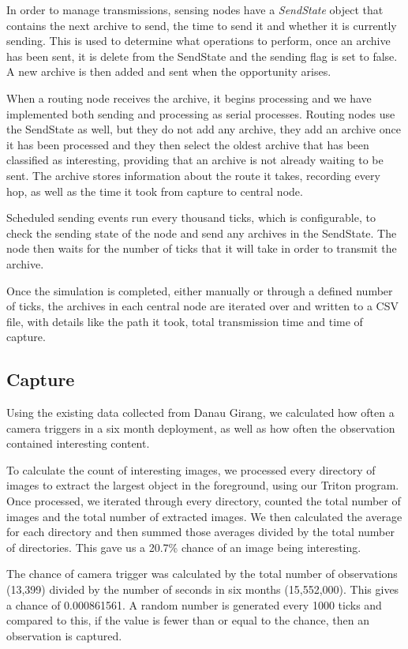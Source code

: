 	In order to manage transmissions, sensing nodes have a \textit{SendState} object that contains the next archive to send, the time to send it and whether it is currently sending. This is used to determine what operations to perform, once an archive has been sent, it is delete from the SendState and the sending flag is set to false. A new archive is then added and sent when the opportunity arises.
	
	When a routing node receives the archive, it begins processing and we have implemented both sending and processing as serial processes. Routing nodes use the SendState as well, but they do not add any archive, they add an archive once it has been processed and they then select the oldest archive that has been classified as interesting, providing that an archive is not already waiting to be sent. The archive stores information about the route it takes, recording every hop, as well as the time it took from capture to central node.
	
	Scheduled sending events run every thousand ticks, which is configurable, to check the sending state of the node and send any archives in the SendState. The node then waits for the number of ticks that it will take in order to transmit the archive.
	
	Once the simulation is completed, either manually or through a defined number of ticks, the archives in each central node are iterated over and written to a CSV file, with details like the path it took, total transmission time and time of capture.
	
\subsection{Capture}
	Using the existing data collected from Danau Girang, we calculated how often a camera triggers in a six month deployment, as well as how often the observation contained interesting content. 
	
	To calculate the count of interesting images, we processed every directory of images to extract the largest object in the foreground, using our Triton program. Once processed, we iterated through every directory, counted the total number of images and the total number of extracted images. We then calculated the average for each directory and then summed those averages divided by the total number of directories. This gave us a 20.7\% chance of an image being interesting.
	
	The chance of camera trigger was calculated by the total number of observations (13,399) divided by the number of seconds in six months (15,552,000). This gives a chance of 0.000861561. A random number is generated every 1000 ticks and compared to this, if the value is fewer than or equal to the chance, then an observation is captured.
	
